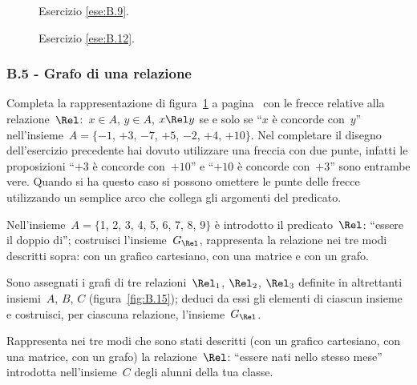 \begin{figure}[b]
\begin{minipage}[b]{.45\textwidth}
 \centering
 
 \caption{Esercizio \ref{ese:B.9}.}\label{fig:B.13}
\end{minipage}\hfil
\begin{minipage}[b]{.45\textwidth}
 \centering
 
 \caption{Esercizio \ref{ese:B.12}.}\label{fig:B.14}
\end{minipage}
\end{figure}
\begin{multicols}{2}
 \subsubsection*{B.5 - Grafo di una relazione}

\begin{esercizio}
\label{ese:B.12}
Completa la rappresentazione di figura~\ref{fig:B.14} a pagina~\pageref{fig:B.14} con le frecce relative alla relazione~$\Rel$:~$x \in A$, $y \in A$, $x \Rel y$ se e solo se ``$x$ è concorde con~$y$''
nell'insieme~$A =\{-1$, $+3$, $-7$, $+5$, $-2$, $+4$, $+10\}$.
\osservazione Nel completare il disegno dell'esercizio precedente hai dovuto utilizzare una freccia con due punte, infatti le proposizioni
``$+3$ è concorde con~$+10$'' e ``$+10$ è concorde con~$+3$'' sono entrambe vere. Quando si ha questo caso si possono omettere le punte
delle frecce utilizzando un semplice arco che collega gli argomenti del predicato.
\end{esercizio}

\begin{esercizio}
\label{ese:B.13}
Nell'insieme~$A = \{$1, 2, 3, 4, 5, 6, 7, 8, 9$\}$ è introdotto il predicato~$\Rel$: ``essere il
doppio di''; costruisci l'insieme~$G_\Rel$, rappresenta la relazione nei tre modi descritti sopra: con un grafico cartesiano,
con una matrice e con un grafo.
\end{esercizio}

\begin{esercizio}
\label{ese:B.14}
Sono assegnati i grafi di tre relazioni~$\Rel_1$, $\Rel_2$, $\Rel_3$ definite in altrettanti insiemi~$A$, $B$, $C$ (figura~\ref{fig:B.15}); deduci da essi gli elementi di ciascun
insieme e costruisci, per ciascuna relazione, l'insieme~$G_\Rel$.
\end{esercizio}

\begin{esercizio}
\label{ese:B.15}
Rappresenta nei tre modi che sono stati descritti (con un grafico cartesiano, con una matrice, con un
grafo) la relazione~$\Rel$: ``essere nati nello stesso mese'' introdotta nell'insieme~$C$ degli alunni della tua classe.
\end{esercizio}


\end{multicols}
